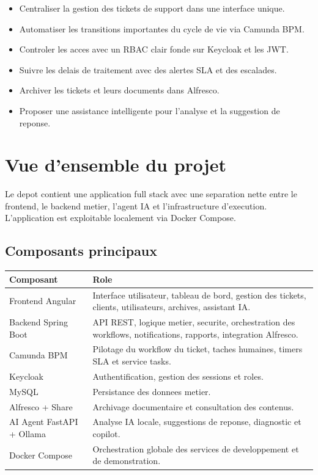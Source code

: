 \documentclass[12pt,a4paper]{article}
\begin{document}
\begin{itemize}[leftmargin=1.2cm]
  \item Centraliser la gestion des tickets de support dans une interface unique.
  \item Automatiser les transitions importantes du cycle de vie via Camunda BPM.
  \item Controler les acces avec un RBAC clair fonde sur Keycloak et les JWT.
  \item Suivre les delais de traitement avec des alertes SLA et des escalades.
  \item Archiver les tickets et leurs documents dans Alfresco.
  \item Proposer une assistance intelligente pour l'analyse et la suggestion de reponse.
\end{itemize}

\section{Vue d'ensemble du projet}

Le depot contient une application full stack avec une separation nette entre le frontend, le backend metier, l'agent IA et l'infrastructure d'execution. L'application est exploitable localement via Docker Compose.

\subsection{Composants principaux}

\begin{longtable}{>{\raggedright\arraybackslash}p{3.3cm} >{\raggedright\arraybackslash}p{9.7cm}}
\toprule
Composant & Role \\
\midrule
Frontend Angular & Interface utilisateur, tableau de bord, gestion des tickets, clients, utilisateurs, archives, assistant IA. \\
Backend Spring Boot & API REST, logique metier, securite, orchestration des workflows, notifications, rapports, integration Alfresco. \\
Camunda BPM & Pilotage du workflow du ticket, taches humaines, timers SLA et service tasks. \\
Keycloak & Authentification, gestion des sessions et roles. \\
MySQL & Persistance des donnees metier. \\
Alfresco + Share & Archivage documentaire et consultation des contenus. \\
AI Agent FastAPI + Ollama & Analyse IA locale, suggestions de reponse, diagnostic et copilot. \\
Docker Compose & Orchestration globale des services de developpement et de demonstration. \\
\bottomrule
\end{longtable}
\end{document}
